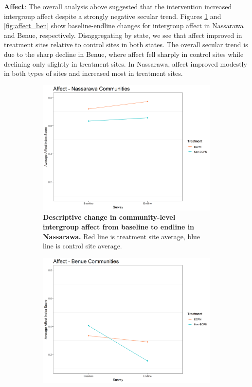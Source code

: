 \documentclass[11pt]{article}
\begin{document}
\textbf{Affect}: The overall analysis above suggested that the
intervention increased intergroup affect despite a strongly negative
secular trend. Figures \ref{fig:affect_nas} and \ref{fig:affect_ben}
show baseline-endline changes for intergroup affect in Nassarawa and
Benue, respectively. Disaggregating by state, we see that affect
improved in treatment sites relative to control sites in both states.
The overall secular trend is due to the sharp decline in Benue, where
affect fell sharply in control sites while declining only slightly in
treatment sites. In Nassarawa, affect improved modestly in both types of
sites and increased most in treatment sites.

\begin{figure}[H]
    \begin{subfigure}[b]{.48\textwidth}
    \centering
        \includegraphics[width=\linewidth]{../../../figs/affectComm_plot_nas.png}
        \caption{\textbf{Descriptive change in community-level intergroup affect from baseline to endline in Nassarawa.} Red line is treatment site average, blue line is control site average.}
        \label{fig:affect_nas}
    \end{subfigure}
    \hfill
    \begin{subfigure}[b]{.48\textwidth}
    \centering
        \includegraphics[width=\linewidth]{../../../figs/affectComm_plot_ben.png}

\end{subfigure}
\end{figure}
\end{document}
